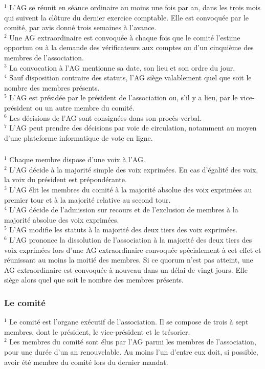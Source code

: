 \documentclass[12pt,a4paper,oneside]{article}
\newcounter{art}
\newcommand{\french}{    \switchcolumn[1]\noindent}
\newcounter{para}
\begin{document}
\begin{paracol}{2}
	$^1$ L’AG se réunit en séance ordinaire au moins une fois par an, dans les trois mois qui suivent la clôture du dernier exercice comptable. Elle est convoquée par le comité, par avis donné trois semaines à l’avance. \\
	$^2$ Une AG extraordinaire est convoquée à chaque fois que le comité l’estime opportun ou à la demande des vérificateurs aux comptes ou d’un cinquième des membres de l’association. \\
	$^3$ La convocation à l’AG mentionne sa date, son lieu et son ordre du jour. \\
	$^4$ Sauf disposition contraire des statuts, l’AG siège valablement quel que soit le nombre des membres présents. \\
	$^5$ L’AG est présidée par le président de l’association ou, s’il y a lieu, par le vice-président ou un autre membre du comité. \\
	$^6$ Les décisions de l’AG sont consignées dans son procès-verbal. \\
	$^7$ L’AG peut prendre des décisions par voie de circulation, notamment au moyen d’une plateforme informatique de vote en ligne.

\french
	\subsubsection{}
	$^1$ Chaque membre dispose d’une voix à l’AG. \\
 	$^2$ L’AG décide à la majorité simple des voix exprimées. En cas d’égalité des voix, la voix du président est prépondérante. \\
	$^3$ L’AG élit les membres du comité à la majorité absolue des voix exprimées au premier tour et à la majorité relative au second tour. \\
	$^4$ L’AG décide de l’admission sur recours et de l’exclusion de membres à la majorité absolue des voix exprimées. \\
	$^5$ L’AG modifie les statuts à la majorité des deux tiers des voix exprimées. \\
	$^6$ L’AG prononce la dissolution de l’association à la majorité des deux tiers des voix exprimées lors d’une AG extraordinaire convoquée spécialement à cet effet et réunissant au moins la moitié des membres. Si ce quorum n’est pas atteint, une AG extraordinaire est convoquée à nouveau dans un délai de vingt jours. Elle siège alors quel que soit le nombre des membres présents.


\french
	\subsubsection{Le comité}
	$^1$ Le comité est l’organe exécutif de l’association. Il se compose de trois à sept membres, dont le président, le vice-président et le trésorier. \\
	$^2$ Les membres du comité sont élus par l’AG parmi les membres de l’association, pour une durée d’un an renouvelable. Au moins l’un d’entre eux doit, si possible, avoir été membre du comité lors du dernier mandat.
 


\end{paracol}
\end{document}
